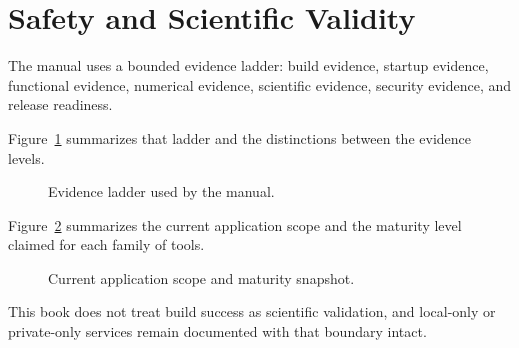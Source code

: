 \section*{Safety and Scientific Validity}
\label{sec:front-matter-safety-and-scientific-validity}

The manual uses a bounded evidence ladder: build evidence, startup evidence, functional evidence, numerical evidence, scientific evidence, security evidence, and release readiness.

Figure~\ref{fig:manual-evidence-ladder} summarizes that ladder and the distinctions between the evidence levels.

\begin{figure}[htbp]
\centering
{}
\caption{Evidence ladder used by the manual.}
\label{fig:manual-evidence-ladder}
\end{figure}

Figure~\ref{fig:manual-application-scope} summarizes the current application scope and the maturity level claimed for each family of tools.

\begin{figure}[htbp]
\centering
{}
\caption{Current application scope and maturity snapshot.}
\label{fig:manual-application-scope}
\end{figure}

This book does not treat build success as scientific validation, and local-only or private-only services remain documented with that boundary intact.

